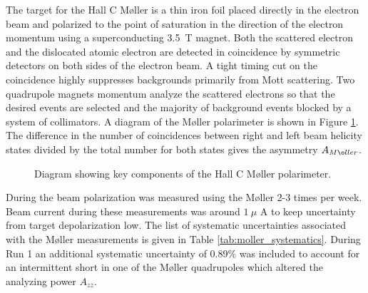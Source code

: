 The target for the Hall C M\o ller is a thin iron foil placed directly in the electron beam and polarized to the point of saturation in the direction of the electron momentum using a superconducting 3.5~T magnet.  Both the scattered electron and the dislocated atomic electron are detected in coincidence by symmetric detectors on both sides of the electron beam. A tight timing cut on the coincidence highly suppresses backgrounds primarily from Mott scattering. Two quadrupole magnets momentum analyze the scattered electrons so that the desired events are selected and the majority of background events blocked by a system of collimators. A diagram of the M\o ller polarimeter is shown in Figure \ref{fig:Moller_diagram}. The difference in the number of coincidences between right and left beam helicity states divided by the total number for both states gives the asymmetry $A_{M\o ller}$.

\begin{figure}[ht]
\centering
{}
\caption{Diagram showing key components of the Hall C M\o ller polarimeter. }
\label{fig:Moller_diagram}
\end{figure}

During \Qs the beam polarization was measured using the M\o ller 2-3 times per week. Beam current during these measurements was around $1~\mu$ A to keep uncertainty from target depolarization low. The list of systematic uncertainties associated with the M\o ller measurements is given in Table \ref{tab:moller_systematics}. During Run 1 an additional systematic uncertainty of 0.89\% was included to account for an intermittent short in one of the M\o ller quadrupoles which altered the analyzing power $A_{zz}$. 


